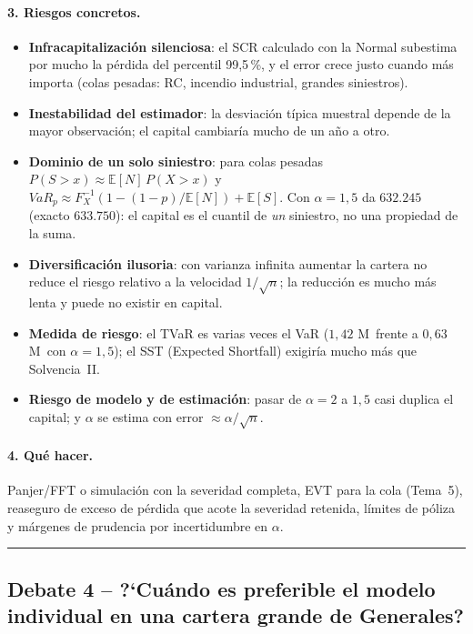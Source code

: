 \documentclass[a4paper,12pt]{article}
\newcommand{\euro}{\texteuro}
\newcommand{\E}{\mathbb{E}}
\begin{document}
\paragraph{3. Riesgos concretos.}
\begin{itemize}[leftmargin=*,itemsep=1pt]
\item \textbf{Infracapitalizaci\'on silenciosa}: el SCR calculado con la Normal subestima por mucho la p\'erdida del percentil 99,5\,\%, y el error crece justo cuando m\'as importa (colas pesadas: RC, incendio industrial, grandes siniestros).
\item \textbf{Inestabilidad del estimador}: la desviaci\'on t\'ipica muestral depende de la mayor observaci\'on; el capital cambiar\'ia mucho de un a\~no a otro.
\item \textbf{Dominio de un solo siniestro}: para colas pesadas $P(S>x)\approx\E[N]\,P(X>x)$ y $VaR_p\approx F_X^{-1}(1-(1-p)/\E[N])+\E[S]$. Con $\alpha=1{,}5$ da $632.245$ (exacto $633.750$): el capital es el cuantil de \emph{un} siniestro, no una propiedad de la suma.
\item \textbf{Diversificaci\'on ilusoria}: con varianza infinita aumentar la cartera no reduce el riesgo relativo a la velocidad $1/\sqrt n$; la reducci\'on es mucho m\'as lenta y puede no existir en capital.
\item \textbf{Medida de riesgo}: el TVaR es varias veces el VaR ($1{,}42$ M\euro\ frente a $0{,}63$ M\euro\ con $\alpha=1{,}5$); el SST (Expected Shortfall) exigir\'ia mucho m\'as que Solvencia~II.
\item \textbf{Riesgo de modelo y de estimaci\'on}: pasar de $\alpha=2$ a $1{,}5$ casi duplica el capital; y $\alpha$ se estima con error $\approx\alpha/\sqrt n$.
\end{itemize}

\paragraph{4. Qu\'e hacer.} Panjer/FFT o simulaci\'on con la severidad completa, EVT para la cola (Tema~5), reaseguro de exceso de p\'erdida que acote la severidad retenida, l\'imites de p\'oliza y m\'argenes de prudencia por incertidumbre en $\alpha$.

\bigskip\hrule\bigskip

\subsection{Debate 4 -- ?`Cu\'ando es preferible el modelo individual en una cartera grande de Generales?}
\end{document}
